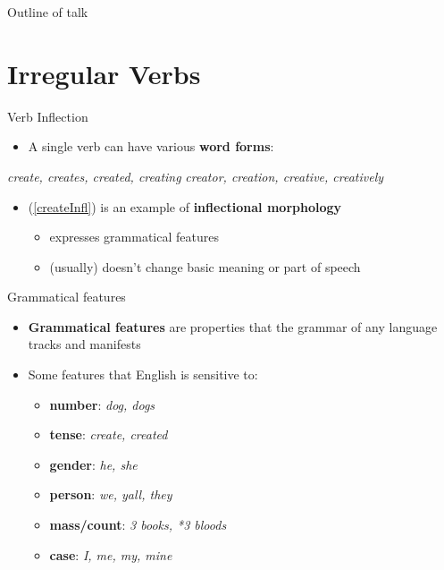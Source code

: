 \documentclass[10pt, compress]{beamer}		%
\begin{document}
\begin{frame}{Outline of talk}
	\tableofcontents
\end{frame}


\section{Irregular Verbs}
\begin{frame}{Verb Inflection}
	\begin{itemize}
		\item A single verb can have various {\bf word forms}:
	\end{itemize}

	\begin{exe}
			\begin{xlist}
			\ex\label{createInfl} \emph{create, creates, created, creating}
			\ex\label{createDer} \emph{creator, creation, creative, creatively}
		\end{xlist}
	\end{exe}

	\begin{itemize}
		\item (\ref{createInfl}) is an example of {\bf inflectional morphology}
		\begin{itemize}
			\item expresses grammatical features
			\item (usually) doesn't change basic meaning or part of speech
		\end{itemize}
	\end{itemize}
\end{frame}

\begin{frame}{Grammatical features}
	\begin{itemize}
		\item \textbf{Grammatical features} are properties that the grammar of any language tracks and manifests
		\item Some features that English is sensitive to:
		\begin{itemize}
			\item \textbf{number}: \emph{dog, dogs}
			\item \textbf{tense}: \emph{create, created}
			\item \textbf{gender}: \emph{he, she}
			\item \textbf{person}: \emph{we, yall, they}
			\item \textbf{mass/count}: \emph{3 books, *3 bloods}
			\item \textbf{case}: \emph{I, me, my, mine}
		\end{itemize}
	\end{itemize}
\end{frame}
\end{document}

